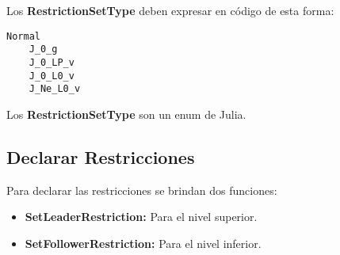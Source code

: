 Los \textbf{RestrictionSetType} deben expresar en código de esta forma:
\begin{lstlisting}[caption={Definir el conjunto de índice activo}]
    Normal 
    J_0_g 
    J_0_LP_v
    J_0_L0_v
    J_Ne_L0_v
\end{lstlisting}

Los \textbf{RestrictionSetType} son un enum de Julia.

\subsection{Declarar Restricciones}

Para declarar las restricciones se brindan dos funciones:
\begin{itemize}
    \item \textbf{SetLeaderRestriction:} Para el nivel superior.
    \item \textbf{SetFollowerRestriction:} Para el nivel inferior.
\end{itemize}
